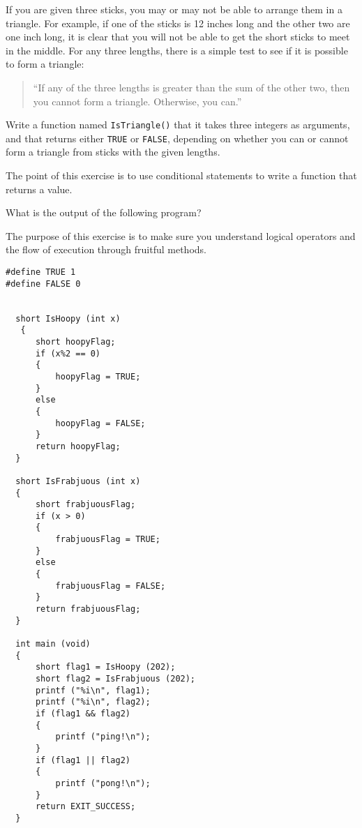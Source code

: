 

\begin{exercise}
If you are given three sticks, you may or may not be able to arrange
them in a triangle.  For example, if one of the sticks is 12 inches
long and the other two are one inch long, it is clear that you will
not be able to get the short sticks to meet in the middle.  For any
three lengths, there is a simple test to see if it is possible to form
a triangle:

\begin{quotation}
``If any of the three lengths is greater than the sum of the other two,
then you cannot form a triangle.  Otherwise, you can.''
\end{quotation}

Write a function named {\tt IsTriangle()} that it takes three integers as
arguments, and that returns either {\tt TRUE} or {\tt FALSE},
depending on whether you can or cannot form a triangle from sticks
with the given lengths.


The point of this exercise is to use conditional statements to
write a function that returns a value.
\end{exercise}





\begin{exercise}
What is the output of the following program? 

The purpose of this exercise is to make sure you understand logical operators and the flow of execution through fruitful methods.

\begin{verbatim}
#define TRUE 1
#define FALSE 0


  short IsHoopy (int x)
   {
      short hoopyFlag;
      if (x%2 == 0) 
      {
          hoopyFlag = TRUE;
      } 
      else 
      {
          hoopyFlag = FALSE;
      }
      return hoopyFlag;
  }

  short IsFrabjuous (int x) 
  {
      short frabjuousFlag;
      if (x > 0) 
      {
          frabjuousFlag = TRUE;
      }
      else 
      {
          frabjuousFlag = FALSE;
      }
      return frabjuousFlag;
  }
  
  int main (void) 
  {
      short flag1 = IsHoopy (202);
      short flag2 = IsFrabjuous (202);
      printf ("%i\n", flag1);
      printf ("%i\n", flag2);
      if (flag1 && flag2) 
      {
          printf ("ping!\n");
      }
      if (flag1 || flag2) 
      {
          printf ("pong!\n");
      }
      return EXIT_SUCCESS;
  }
  
\end{verbatim}
\end{exercise}



